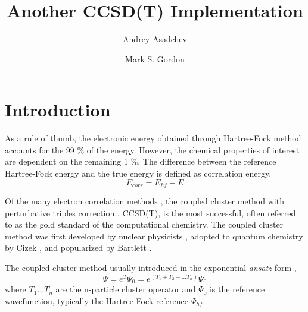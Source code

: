 \documentclass[12pt]{article} \usepackage[margin=1in]{geometry}
\begin{document}
\title{Another CCSD(T) Implementation}
\author{Andrey Asadchev \and Mark S. Gordon}
\date{}

\maketitle




\section{Introduction}
As a rule of thumb, the electronic energy obtained through
Hartree-Fock method accounts for the 99 \% of the energy.  However,
the chemical properties of interest are dependent on the remaining 1
\%.  The difference between the reference Hartree-Fock energy and the
true energy is defined as correlation energy,
$$E_{corr} = E_{hf} - E$$

Of the many electron correlation methods \cite{pople1977variational,
pople1987quadratic,pople1992kohn}, the coupled cluster method with
perturbative triples correction \cite{raghavachari1989fifth}, CCSD(T),
is the most successful, often referred to as the gold standard of the
computational chemistry.  The coupled cluster method was first
developed by nuclear physicists \cite{coester1960short}, adopted to
quantum chemistry by Cizek \cite{vcivzek1966correlation,paldus1972correlation,mukherjee1977applications,lindgren1978coupled,scuseria1988efficient,piecuch1999coupled}, and
popularized by Bartlett \cite{purvis1982full}.

The coupled cluster method usually introduced in the exponential
{\it ansatz} form \cite{szabo1996modern, janowski2007parallel},
$$\Psi = e^{T} \Psi_0 = e^{(T_1 + T_2 + ... T_n)} \Psi_0$$ 
where $T_1 ... T_n$ are the n-particle cluster operator and $\Psi_0$
is the reference wavefunction, typically the Hartree-Fock reference
$\Psi_{hf}$.
\end{document}
